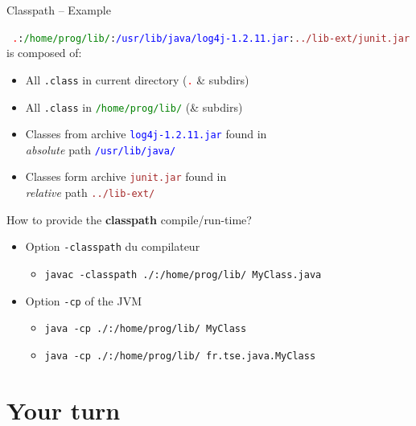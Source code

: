 \documentclass[English,c,%
hyperref={%
    pdftitle={FISA-DE2 OOP in Java},%
    pdfauthor={Muller, Gravier, Laforest, Subercaze},%
    pdfsubject={OOP in Java},%
    pdfkeywords={OOP, Java},%
    colorlinks=true,%
    urlcolor=blue,%
    linkcolor=%
    },%
xcolor={pdftex,svgnames} %
]{beamer}
\begin{document}
\begin{frame}{Classpath -- Example}

{\footnotesize
  \texttt{
    \textcolor{red}{.}:\textcolor{green}{/home/prog/lib/}:\textcolor{blue}{/usr/lib/java/log4j-1.2.11.jar}:\textcolor{brown}{../lib-ext/junit.jar}
  }
}
is composed of:
\begin{itemize}
    \item All \texttt{.class} in current directory (\texttt{\textcolor{red}{.}} \& subdirs)
    \item All \texttt{.class} in \texttt{\textcolor{green}{/home/prog/lib/}} (\& subdirs)
    \item Classes from archive \texttt{\textcolor{blue}{log4j-1.2.11.jar}} found in\\
    \textit{absolute} path \texttt{\textcolor{blue}{/usr/lib/java/}}
    \item Classes form archive \texttt{\textcolor{brown}{junit.jar}} found in\\
    \textit{relative} path \texttt{\textcolor{brown}{../lib-ext/}}
\end{itemize}
\end{frame}


\begin{frame}{How to provide the \textbf{classpath} compile/run-time?}
  \begin{itemize}
    \item Option \texttt{-classpath} du compilateur
    \begin{itemize}
      \item \texttt{javac -classpath ./:/home/prog/lib/  MyClass.java}
    \end{itemize}
    \bigskip
    \item Option \texttt{-cp} of the JVM
    \begin{itemize}
      \item \texttt{java -cp ./:/home/prog/lib/  MyClass}
      \item \texttt{java -cp ./:/home/prog/lib/  fr.tse.java.MyClass}
    \end{itemize}
  \end{itemize}
\end{frame}


\section{Your turn}
\end{document}
